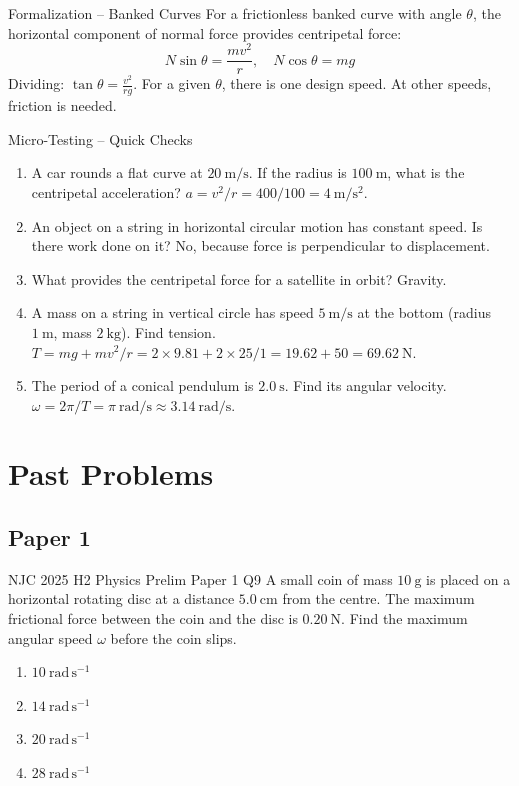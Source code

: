 \documentclass[11pt]{beamer}
\begin{document}
\begin{frame}{Formalization – Banked Curves}
For a frictionless banked curve with angle $\theta$, the horizontal component of normal force provides centripetal force:
\[ N\sin\theta = \frac{mv^2}{r}, \quad N\cos\theta = mg \]
Dividing: $\tan\theta = \frac{v^2}{rg}$.
For a given $\theta$, there is one design speed. At other speeds, friction is needed.
\end{frame}

\begin{frame}{Micro-Testing – Quick Checks}
\begin{enumerate}
    \item A car rounds a flat curve at $20\ \mathrm{m/s}$. If the radius is $100\ \mathrm{m}$, what is the centripetal acceleration? \pause \alert{$a = v^2/r = 400/100 = 4\ \mathrm{m/s^2}$}.
    \item An object on a string in horizontal circular motion has constant speed. Is there work done on it? \pause \alert{No, because force is perpendicular to displacement.}
    \item What provides the centripetal force for a satellite in orbit? \pause \alert{Gravity.}
    \item A mass on a string in vertical circle has speed $5\ \mathrm{m/s}$ at the bottom (radius $1\ \mathrm{m}$, mass $2\ \mathrm{kg}$). Find tension. \pause \alert{$T = mg + mv^2/r = 2\times9.81 + 2\times25/1 = 19.62 + 50 = 69.62\ \mathrm{N}$}.
    \item The period of a conical pendulum is $2.0\ \mathrm{s}$. Find its angular velocity. \pause \alert{$\omega = 2\pi/T = \pi\ \mathrm{rad/s} \approx 3.14\ \mathrm{rad/s}$}.
\end{enumerate}
\end{frame}

\section{Past Problems}

\subsection{Paper 1}

\begin{frame}[shrink=15]{NJC 2025 H2 Physics Prelim Paper 1 Q9}
A small coin of mass $10\ \mathrm{g}$ is placed on a horizontal rotating disc at a distance $5.0\ \mathrm{cm}$ from the centre. The maximum frictional force between the coin and the disc is $0.20\ \mathrm{N}$. Find the maximum angular speed $\omega$ before the coin slips.
\begin{enumerate}[A]
    \item $10\ \mathrm{rad\,s^{-1}}$
    \item $14\ \mathrm{rad\,s^{-1}}$
    \item $20\ \mathrm{rad\,s^{-1}}$
    \item $28\ \mathrm{rad\,s^{-1}}$
\end{enumerate}
\end{frame}
\end{document}
